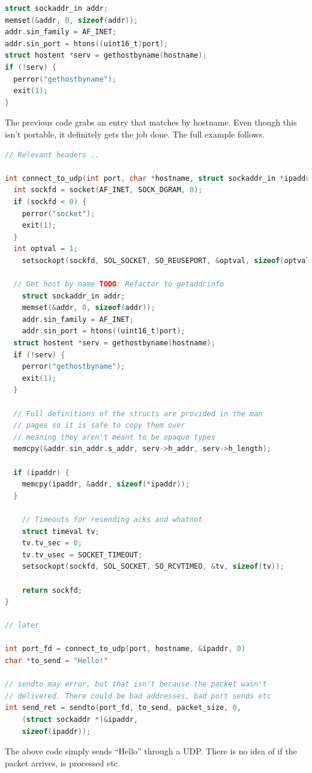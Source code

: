 \begin{lstlisting}[language=C]
struct sockaddr_in addr;
memset(&addr, 0, sizeof(addr));
addr.sin_family = AF_INET;
addr.sin_port = htons((uint16_t)port);
struct hostent *serv = gethostbyname(hostname);
if (!serv) {
  perror("gethostbyname");
  exit(1);
}
\end{lstlisting}

The previous code grabs an entry  that matches by hostname.
Even though this isn't portable, it definitely gets the job done.
The full example follows.

\begin{lstlisting}[language=C]
// Relevant headers ..

int connect_to_udp(int port, char *hostname, struct sockaddr_in *ipaddr) {
  int sockfd = socket(AF_INET, SOCK_DGRAM, 0);
  if (sockfd < 0) {
    perror("socket");
    exit(1);
  }
  int optval = 1;
	setsockopt(sockfd, SOL_SOCKET, SO_REUSEPORT, &optval, sizeof(optval));

  // Get host by name TODO: Refactor to getaddrinfo
	struct sockaddr_in addr;
	memset(&addr, 0, sizeof(addr));
	addr.sin_family = AF_INET;
	addr.sin_port = htons((uint16_t)port);
  struct hostent *serv = gethostbyname(hostname);
  if (!serv) {
    perror("gethostbyname");
    exit(1);
  }

  // Full definitions of the structs are provided in the man
  // pages so it is safe to copy them over
  // meaning they aren't meant to be opaque types
  memcpy(&addr.sin_addr.s_addr, serv->h_addr, serv->h_length);

  if (ipaddr) {
    memcpy(ipaddr, &addr, sizeof(*ipaddr));
  }

	// Timeouts for resending acks and whatnot
	struct timeval tv;
	tv.tv_sec = 0;
	tv.tv_usec = SOCKET_TIMEOUT;
	setsockopt(sockfd, SOL_SOCKET, SO_RCVTIMEO, &tv, sizeof(tv));

	return sockfd;
}

// later

int port_fd = connect_to_udp(port, hostname, &ipaddr, 0)
char *to_send = "Hello!"

// sendto may error, but that isn't because the packet wasn't
// delivered. There could be bad addresses, bad port sends etc
int send_ret = sendto(port_fd, to_send, packet_size, 0,
    (struct sockaddr *)&ipaddr,
    sizeof(ipaddr));
\end{lstlisting}

The above code simply sends ``Hello'' through a UDP. There is no idea of if the packet arrives, is processed etc.

